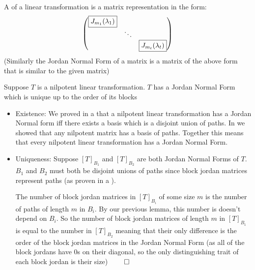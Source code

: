 \documentclass[10pt]{article}
\begin{document}
\begin{definition}

A  of a linear transformation is a matrix representation in the form:
\[ \begin{pmatrix} \fbox{$J_{m_1}(\lambda_1)$} & & \\ & \ddots & \\ & & \fbox{$J_{m_t}(\lambda_t)$} \end{pmatrix} \]
(Similarly the Jordan Normal Form of a matrix is a matrix of the above form that is similar to the given matrix)

\end{definition}

\begin{theorem}{Suppose $T$ is a nilpotent linear transformation. $T$ has a Jordan Normal Form which is unique up to the order of its blocks}

\begin{itemize}
    \item Existence: We proved in a  that a nilpotent linear transformation has a Jordan Normal form iff there exists a basis which is a disjoint union of paths. In  we showed that any nilpotent matrix has a basis of paths. Together this means that every nilpotent linear transformation has a Jordan Normal Form.
    
    \item Uniqueness: Suppose $[T]_{B_1}$ and $[T]_{B_2}$ are both Jordan Normal Forms of $T$. $B_1$ and $B_2$ must both be disjoint unions of paths since block jordan matrices represent paths (as proven in a ). 
    
    The number of block jordan matrices in $[T]_{B_i}$ of some size $m$ is the number of paths of length $m$ in $B_i$. By our previous lemma, this number is doesn't depend on $B_i$. So the number of block jordan matrices of length $m$ in $[T]_{B_1}$ is equal to the number in $[T]_{B_2}$ meaning that their only difference is the order of the block jordan matrices in the Jordan Normal Form (as all of the block jordans have $0$s on their diagonal, so the only distinguishing trait of each block jordan is their size) $\qed$
\end{itemize}

\end{theorem}
\end{document}
